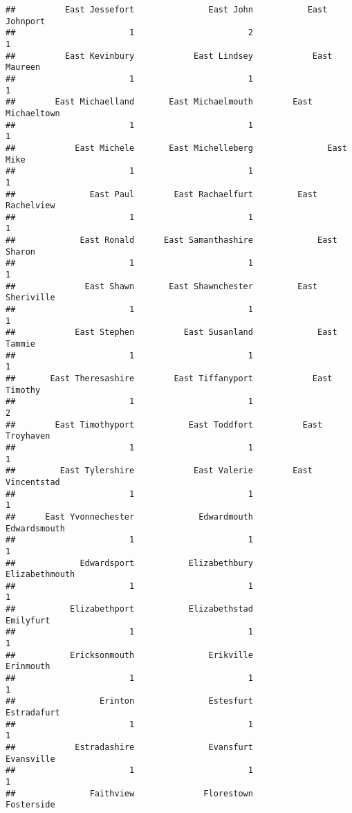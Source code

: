 \documentclass[
]{article}
\begin{document}
\begin{verbatim}
##          East Jessefort               East John           East Johnport 
##                       1                       2                       1 
##          East Kevinbury            East Lindsey            East Maureen 
##                       1                       1                       1 
##        East Michaelland       East Michaelmouth        East Michaeltown 
##                       1                       1                       1 
##            East Michele       East Michelleberg               East Mike 
##                       1                       1                       1 
##               East Paul        East Rachaelfurt         East Rachelview 
##                       1                       1                       1 
##             East Ronald      East Samanthashire             East Sharon 
##                       1                       1                       1 
##              East Shawn       East Shawnchester         East Sheriville 
##                       1                       1                       1 
##            East Stephen          East Susanland             East Tammie 
##                       1                       1                       1 
##       East Theresashire        East Tiffanyport            East Timothy 
##                       1                       1                       2 
##        East Timothyport           East Toddfort          East Troyhaven 
##                       1                       1                       1 
##         East Tylershire            East Valerie        East Vincentstad 
##                       1                       1                       1 
##      East Yvonnechester             Edwardmouth            Edwardsmouth 
##                       1                       1                       1 
##             Edwardsport           Elizabethbury          Elizabethmouth 
##                       1                       1                       1 
##           Elizabethport           Elizabethstad               Emilyfurt 
##                       1                       1                       1 
##           Ericksonmouth               Erikville               Erinmouth 
##                       1                       1                       1 
##                 Erinton               Estesfurt             Estradafurt 
##                       1                       1                       1 
##            Estradashire               Evansfurt              Evansville 
##                       1                       1                       1 
##               Faithview              Florestown              Fosterside 

\end{verbatim}
\end{document}
